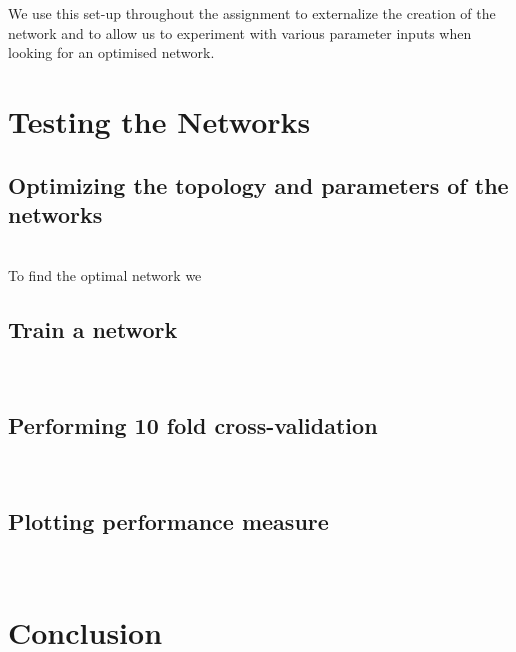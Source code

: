 \documentclass[a4paper,12pt,oneside,final]{report}
\begin{document}
We use this set-up throughout the assignment to externalize the creation of the network and to allow us to experiment with various parameter inputs when looking for an optimised network.

\chapter{Testing the Networks}

\section{Optimizing the topology and parameters of the networks} \hfill \\
To find the optimal network we 
\section{Train a network} \hfill \\
\section{Performing 10 fold cross-validation} \hfill \\
\section{Plotting performance measure} \hfill \\

\chapter{Conclusion}




\begin{appendices}

\end{appendices}
\end{document}
